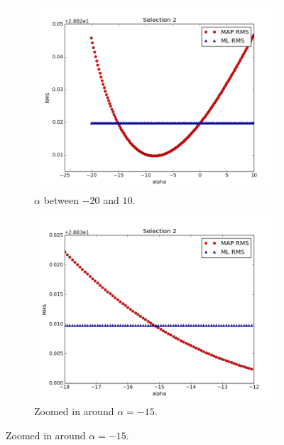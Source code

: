 \documentclass[a4paper]{article}
\begin{document}
\begin{figure}[H]
  \begin{adjustwidth}{-7em}{-7em}
    \centering
    \begin{subfigure}{.32\linewidth}
      \includegraphics[width=\linewidth]{figures/alpha_vs_rms_selection2a.png}
      \caption{$\alpha$ between $-20$ and $10$.}
      \label{fig:alpha_vs_rms_selection2a}
    \end{subfigure}
    \begin{subfigure}{.32\linewidth}
      \includegraphics[width=\linewidth]{figures/alpha_vs_rms_selection2b.png}
      \caption{Zoomed in around $\alpha = -15$.}
      \label{fig:alpha_vs_rms_selection2b}
    \end{subfigure}

\end{adjustwidth}
\end{figure}
\end{document}

